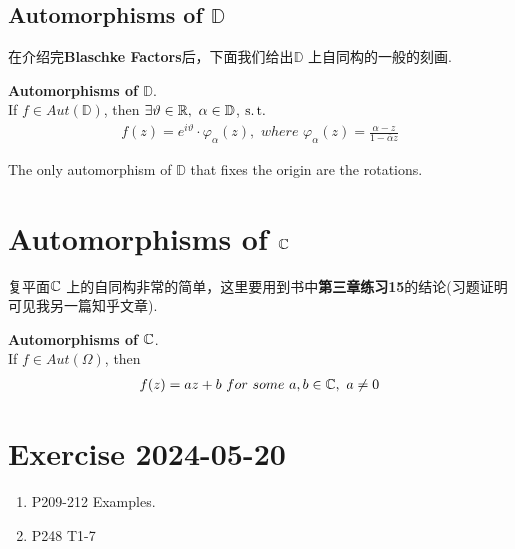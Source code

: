 \vspace*{6em}
\subsection{Automorphisms of $\mathbb{D}$}
	在介绍完\textbf{Blaschke Factors}后，下面我们给出$\mathbb{D}$ 上自同构的一般的刻画.
	\begin{thm}\label{thm 13.2.1}
		\textbf{Automorphisms of $\mathbb{D}$}. \\
		If $f \in Aut(\mathbb{D})$, then $\exists \vartheta \in \mathbb{R} , \,\, \alpha \in \mathbb{D}$, $\operatorname{s.t.}$
		\begin{align}
			f(z) = e^{i\vartheta} \cdot \varphi_\alpha(z), \,\, where \,\, \varphi_\alpha(z) = \frac{\alpha - z}{1 - \overline{\alpha} z}
		\end{align}
	\end{thm}
	
	\vspace*{2em}
	\begin{corollary}\label{cor 13.2.2}
		The only automorphism of $\mathbb{D}$ that fixes the origin are the rotations.
	\end{corollary}

\newpage
\section{Automorphisms of $\mathbb{C}$}
	复平面$\mathbb{C}$ 上的自同构非常的简单，这里要用到书中\textbf{第三章练习15}的结论(习题证明可见我另一篇知乎文章).
	\begin{thm}\label{thm 13.3.1}
		\textbf{Automorphisms of $\mathbb{C}$}. \\
		If $f \in Aut(\Omega)$, then
		\begin{align}
			f(z) = az + b \,\, for \,\, some \,\, a , b \in \mathbb{C} , \,\, a \neq 0
		\end{align}
	\end{thm}

\newpage
\section{Exercise 2024-05-20}
	\begin{enumerate}
		\item P209-212 Examples. 
		
		\vspace*{2em}
		
		\item P248 T1-7
	\end{enumerate}





	\ifx\allfiles\undefined

\fi